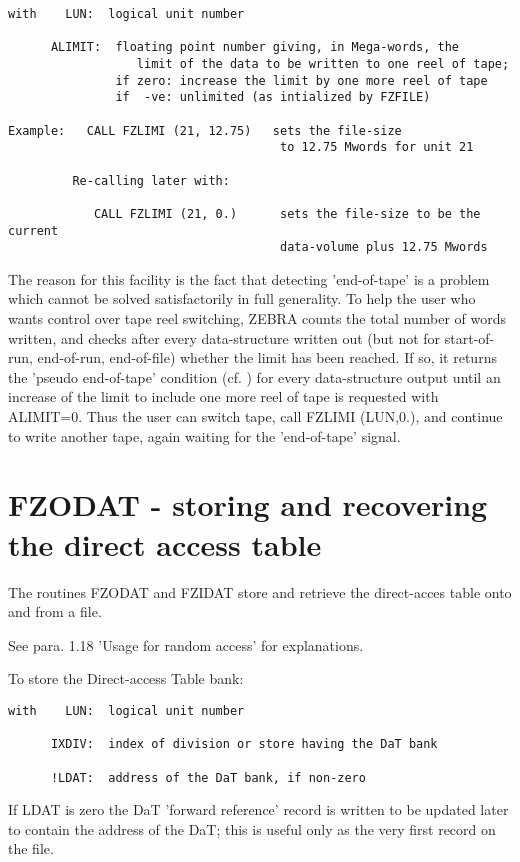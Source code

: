 \begin{verbatim}
with    LUN:  logical unit number

      ALIMIT:  floating point number giving, in Mega-words, the
                  limit of the data to be written to one reel of tape;
               if zero: increase the limit by one more reel of tape
               if  -ve: unlimited (as intialized by FZFILE)

Example:   CALL FZLIMI (21, 12.75)   sets the file-size
                                      to 12.75 Mwords for unit 21

         Re-calling later with:

            CALL FZLIMI (21, 0.)      sets the file-size to be the current
                                      data-volume plus 12.75 Mwords
\end{verbatim}
\spnorm
The reason for this facility is the fact that detecting 'end-of-tape'
is a problem which cannot be solved satisfactorily in full
generality.
To help the user who wants control over tape reel switching,
ZEBRA counts the total number of words written,
and checks after every data-structure written out
(but not for start-of-run, end-of-run, end-of-file)
whether the limit has been reached.
If so, it returns the 'pseudo end-of-tape' condition (cf. )
for every data-structure output until an increase of the limit
to include one more reel of tape is requested with ALIMIT=0.
Thus the user can switch tape,
call FZLIMI (LUN,0.),
and continue to write another tape,
again waiting for the 'end-of-tape' signal.

\section{FZODAT - storing and recovering the direct access table}

The routines FZODAT and FZIDAT store and retrieve the direct-acces table
onto and from a file.

See para. 1.18 'Usage for random access' for explanations.

To store the Direct-access Table bank:

\begin{verbatim}
with    LUN:  logical unit number

      IXDIV:  index of division or store having the DaT bank

      !LDAT:  address of the DaT bank, if non-zero
\end{verbatim}
If LDAT is zero the DaT 'forward reference' record is written
to be updated later to contain the address of the DaT;
this is useful only as the very first record on the file.

